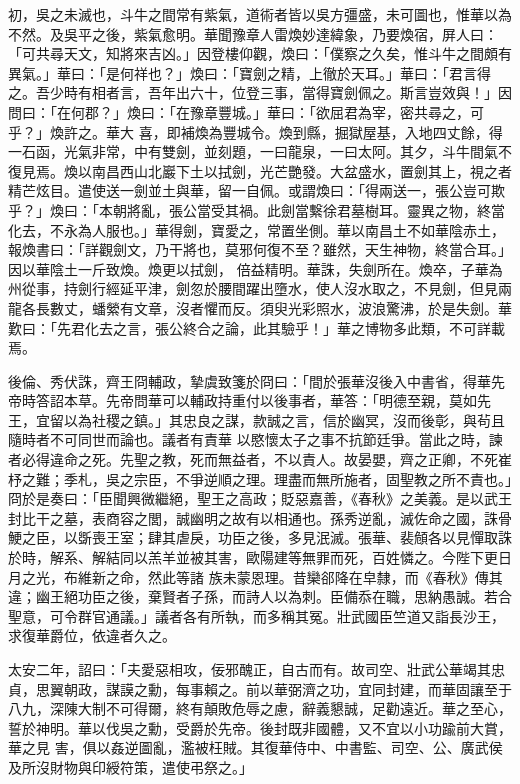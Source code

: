 \begin{pinyinscope}
 初，吳之未滅也，斗牛之間常有紫氣，道術者皆以吳方彊盛，未可圖也，惟華以為不然。及吳平之後，紫氣愈明。華聞豫章人雷煥妙達緯象，乃要煥宿，屏人曰：「可共尋天文，知將來吉凶。」因登樓仰觀，煥曰：「僕察之久矣，惟斗牛之間頗有異氣。」華曰：「是何祥也？」煥曰：「寶劍之精，上徹於天耳。」華曰：「君言得之。吾少時有相者言，吾年出六十，位登三事，當得寶劍佩之。斯言豈效與！」因問曰：「在何郡？」煥曰：「在豫章豐城。」華曰：「欲屈君為宰，密共尋之，可乎？」煥許之。華大
 喜，即補煥為豐城令。煥到縣，掘獄屋基，入地四丈餘，得一石函，光氣非常，中有雙劍，並刻題，一曰龍泉，一曰太阿。其夕，斗牛間氣不復見焉。煥以南昌西山北巖下土以拭劍，光芒艷發。大盆盛水，置劍其上，視之者精芒炫目。遣使送一劍並土與華，留一自佩。或謂煥曰：「得兩送一，張公豈可欺乎？」煥曰：「本朝將亂，張公當受其禍。此劍當繫徐君墓樹耳。靈異之物，終當化去，不永為人服也。」華得劍，寶愛之，常置坐側。華以南昌土不如華陰赤土，報煥書曰：「詳觀劍文，乃干將也，莫邪何復不至？雖然，天生神物，終當合耳。」因以華陰土一斤致煥。煥更以拭劍，
 倍益精明。華誅，失劍所在。煥卒，子華為州從事，持劍行經延平津，劍忽於腰間躍出墮水，使人沒水取之，不見劍，但見兩龍各長數丈，蟠縈有文章，沒者懼而反。須臾光彩照水，波浪驚沸，於是失劍。華歎曰：「先君化去之言，張公終合之論，此其驗乎！」華之博物多此類，不可詳載焉。



 後倫、秀伏誅，齊王冏輔政，摯虞致箋於冏曰：「間於張華沒後入中書省，得華先帝時答詔本草。先帝問華可以輔政持重付以後事者，華答：「明德至親，莫如先王，宜留以為社稷之鎮。」其忠良之謀，款誠之言，信於幽冥，沒而後彰，與茍且隨時者不可同世而論也。議者有責華
 以愍懷太子之事不抗節廷爭。當此之時，諫者必得違命之死。先聖之教，死而無益者，不以責人。故晏嬰，齊之正卿，不死崔杼之難；季札，吳之宗臣，不爭逆順之理。理盡而無所施者，固聖教之所不責也。」冏於是奏曰：「臣聞興微繼絕，聖王之高政；貶惡嘉善，《春秋》之美義。是以武王封比干之墓，表商容之閭，誠幽明之故有以相通也。孫秀逆亂，滅佐命之國，誅骨鯁之臣，以斲喪王室；肆其虐戾，功臣之後，多見泯滅。張華、裴頠各以見憚取誅於時，解系、解結同以羔羊並被其害，歐陽建等無罪而死，百姓憐之。今陛下更日月之光，布維新之命，然此等諸
 族未蒙恩理。昔欒郤降在皁隸，而《春秋》傳其違；幽王絕功臣之後，棄賢者子孫，而詩人以為刺。臣備忝在職，思納愚誠。若合聖意，可令群官通議。」議者各有所執，而多稱其冤。壯武國臣竺道又詣長沙王，求復華爵位，依違者久之。



 太安二年，詔曰：「夫愛惡相攻，佞邪醜正，自古而有。故司空、壯武公華竭其忠貞，思翼朝政，謀謨之勳，每事賴之。前以華弼濟之功，宜同封建，而華固讓至于八九，深陳大制不可得爾，終有顛敗危辱之慮，辭義懇誠，足勸遠近。華之至心，誓於神明。華以伐吳之勳，受爵於先帝。後封既非國體，又不宜以小功踰前大賞，華之見
 害，俱以姦逆圖亂，濫被枉賊。其復華侍中、中書監、司空、公、廣武侯及所沒財物與印綬符策，遣使弔祭之。」




\end{pinyinscope}
